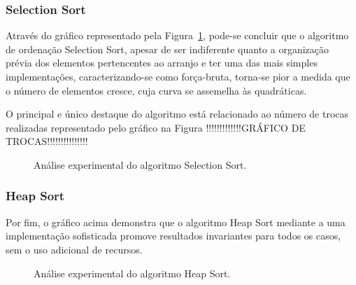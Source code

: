 \documentclass[conference]{IEEEtran}
\begin{document}
\subsubsection{Selection Sort}

Através do gráfico representado pela Figura~\ref{image: graph-selection}, pode-se concluir que o algoritmo de ordenação Selection Sort, apesar de ser indiferente quanto a organização prévia dos elementos pertencentes ao arranjo e ter uma das mais simples implementações, caracterizando-se como força-bruta, torna-se pior a medida que o número de elementos cresce, cuja curva se assemelha às quadráticas.

O principal e único destaque do algoritmo está relacionado ao número de trocas realizadas representado pelo gráfico na Figura !!!!!!!!!!!!!GRÁFICO DE TROCAS!!!!!!!!!!!!!!!
\begin{figure}


\centering
{}
\caption{Análise experimental do algoritmo Selection Sort.}
\label{image: graph-selection}
\end{figure}




\subsubsection{Heap Sort}

Por fim, o gráfico acima demonstra que o algoritmo Heap Sort mediante a uma implementação sofisticada promove resultados invariantes para todos os casos, sem o uso adicional de recursos.

\begin{figure}
\label{image: graph-heap}

\centering
{}
\caption{Análise experimental do algoritmo Heap Sort.}
\end{figure}
\end{document}
